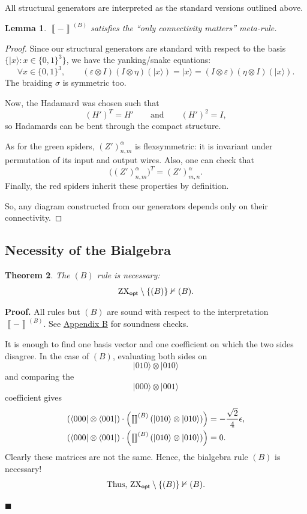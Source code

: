 \documentclass[copyright,creativecommons]{eptcs}
\newcommand{\typedfig}[1]{\IfFileExists{latex_typed/b_rule_note/figures/#1.tikz}{}{}}
\newcommand{\tombstone}{\par\nobreak\hfill\ensuremath{\blacksquare}}
\newcommand{\zxbig}[1]{\vcenter{\hbox{\scalebox{1}{\typedfig{#1}}}}}
\newcommand{\zxopt}{\ensuremath{\textup{ZX}_{\textsf{opt}}}\xspace}
\newcommand{\sem}[1]{\left\llbracket #1 \right\rrbracket}
\newtheorem{theorem}{Theorem}[section]
\newtheorem{lemma}[theorem]{Lemma}
\theoremstyle{definition}
\theoremstyle{remark}
\begin{document}
All structural generators are interpreted as the standard versions outlined above.

\begin{lemma}
\label{lem:connectivity-soundness}
\(\sem{-}^{(B)}\) satisfies the ``only connectivity matters'' meta-rule.
\end{lemma}

\begin{proof}
Since our structural generators are standard with respect to the basis \(\{\lvert x\rangle:x\in\{0,1\}^3\}\), we have the yanking/snake equations:
\[
\forall x\in\{0,1\}^3,\qquad
(\varepsilon\otimes I)(I\otimes\eta)(\lvert x\rangle)
=
\lvert x\rangle
=
(I\otimes\varepsilon)(\eta\otimes I)(\lvert x\rangle).
\]
The braiding \(\sigma\) is symmetric too.

Now, the Hadamard was chosen such that
\[
(H')^T=H' \qquad\text{and}\qquad (H')^2=I,
\]
so Hadamards can be bent through the compact structure.

As for the green spiders, \((Z')^\alpha_{n,m}\) is flexsymmetric: it is invariant under permutation of its input and output wires.
Also, one can check that
\[
\bigl((Z')^\alpha_{n,m}\bigr)^T=(Z')^\alpha_{m,n}.
\]
Finally, the red spiders inherit these properties by definition.

So, any diagram constructed from our generators depends only on their connectivity.
\end{proof}

\subsection{Necessity of the Bialgebra}
\label{sec:necessity-of-the-bialgebra}

\begin{theorem}
\label{thm:b-rule-necessity}
The \((B)\) rule is necessary:
\[
\zxopt\setminus\{(B)\}\nvdash (B).
\]
\end{theorem}

\noindent\textbf{Proof.} All rules but \((B)\) are sound with respect to the interpretation \(\sem{-}^{(B)}\).
See \hyperref[app:b-rule-soundness-checks]{Appendix B} for soundness checks.

It is enough to find one basis vector and one coefficient on which the two sides disagree.
In the case of \((B)\), evaluating both sides on
\[
\lvert 010\rangle\otimes\lvert 010\rangle
\]
and comparing the
\[
\lvert 000\rangle\otimes\lvert 001\rangle
\]
coefficient gives
\begingroup
\small
\[
\begin{aligned}
(\bra{000}\otimes\bra{001})\cdot
\Bigl(\sem{\zxbig{B-LHS-only}}^{(B)}(\ket{010}\otimes\ket{010})\Bigr)
&=-\frac{\sqrt 2}{4}\epsilon,\\
(\bra{000}\otimes\bra{001})\cdot
\Bigl(\sem{\zxbig{B-RHS-only}}^{(B)}(\ket{010}\otimes\ket{010})\Bigr)
&=0.
\end{aligned}
\]
\endgroup
Clearly these matrices are not the same. Hence, the bialgebra rule \((B)\) is necessary!
\[
\text{Thus, }\zxopt\setminus\{(B)\}\nvdash(B).
\]
\tombstone
\end{document}

